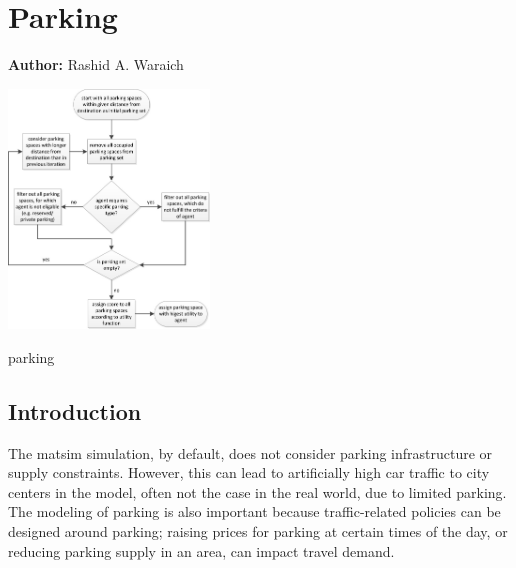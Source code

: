 \chapter{Parking}
\label{ch:parking}

\hfill \textbf{Author:} Rashid A. Waraich

\begin{center} \includegraphics[width=0.4\textwidth, angle=0]{extending/figures/Parking/parking_algo.png} \end{center}


%
{parking}{\citet[][]{WaraichAxhausen_TRR_2012, WaraichEtAl_TechRep_IVT_2013_2, Waraich_unpub_Brownbag_2014, WaraichEtAl_unpub_STRC_2014}}




\section{Introduction} 
The \gls{matsim} simulation, by default, does not consider parking infrastructure or supply constraints. However, this can lead to artificially high car traffic to city centers in the model, often not the case in the real world, due to limited parking. The modeling of parking is also important because traffic-related policies can be designed around parking; \eg raising  prices for parking at certain times of the day, or reducing parking supply in an area, can impact travel demand. 


